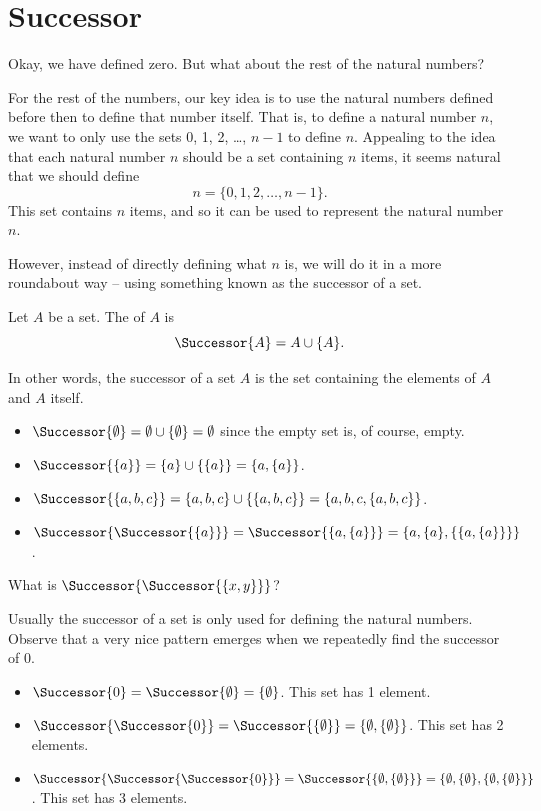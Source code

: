 \section{Successor}
Okay, we have defined zero. But what about the rest of the natural numbers?

For the rest of the numbers, our key idea is to use the natural numbers defined before then to define that number itself. That is, to define a natural number $n$, we want to only use the sets 0, 1, 2, \dots, $n-1$ to define $n$. Appealing to the idea that each natural number $n$ should be a set containing $n$ items, it seems natural that we should define
\[
    n = \{0, 1, 2, \dots, n-1\}.
\]
This set contains $n$ items, and so it can be used to represent the natural number $n$.

However, instead of directly defining what $n$ is, we will do it in a more roundabout way -- using something known as the successor of a set.

\begin{definition}[Successor]
    Let $A$ be a set. The  of $A$ is
    \[
        \Successor{A} = A \cup \{A\}.
    \]
\end{definition}
In other words, the successor of a set $A$ is the set containing the elements of $A$ and $A$ itself.

\begin{example}[Successor]
    \begin{itemize}[leftmargin=*]
        \item $\Successor{\emptyset} = \emptyset \cup \{\emptyset\} = \emptyset$ since the empty set is, of course, empty.
        \item $\Successor{\{a\}} = \{a\} \cup \{\{a\}\} = \{a, \{a\}\}$.
        \item $\Successor{\{a, b, c\}} = \{a, b, c\} \cup \{\{a, b, c\}\} = \{a, b, c, \{a, b, c\}\}$.
        \item $\Successor{\Successor{\{a\}}} = \Successor{\{a, \{a\}\}} = \{a, \{a\}, \{\{a, \{a\}\}\}\}$.
    \end{itemize}
\end{example}

\begin{exercise}
    What is $\Successor{\Successor{\{x, y\}}}$?
\end{exercise}

Usually the successor of a set is only used for defining the natural numbers. Observe that a very nice pattern emerges when we repeatedly find the successor of 0.
\begin{itemize}
    \item $\Successor{0} = \Successor{\emptyset} = \{\emptyset\}$. This set has 1 element.
    \item $\Successor{\Successor{0}} = \Successor{\{\emptyset\}} = \{\emptyset, \{\emptyset\}\}$. This set has 2 elements.
    \item $\Successor{\Successor{\Successor{0}}} = \Successor{\{\emptyset, \{\emptyset\}\}} = \{\emptyset, \{\emptyset\}, \{\emptyset, \{\emptyset\}\}\}$. This set has 3 elements.
\end{itemize}

